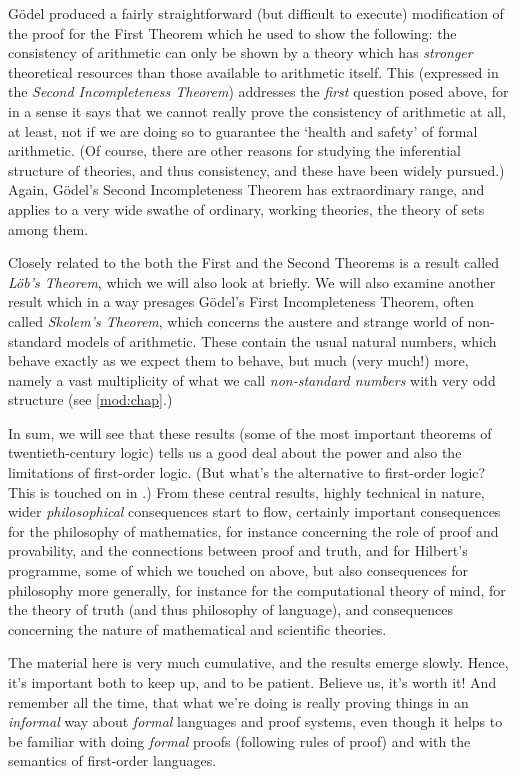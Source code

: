 G\"odel  produced a fairly straightforward (but difficult to execute)
modification of the proof  for the First Theorem which he used to show
the following: the consistency of arithmetic can only be shown by a
theory which has \emph{stronger} theoretical resources than those
available to arithmetic itself. This (expressed in the \emph{Second
Incompleteness Theorem}) addresses the \emph{first} question posed
above, for in a sense it says that we cannot really prove the
consistency of arithmetic at all, at least, not  if we are doing so to
guarantee the `health and safety' of formal arithmetic.  (Of course,
there are other reasons for studying the inferential structure of
theories, and thus consistency, and these have been widely pursued.)
Again, G\"odel's Second Incompleteness Theorem   has extraordinary
range, and applies to a very wide swathe of ordinary, working
theories, the theory of sets among them. 

Closely related to the both the First and the Second Theorems is a
result called \emph{L\"ob's Theorem}, which we will also look at
briefly. We will also examine another result which in a way presages
G\"odel's First Incompleteness Theorem, often called \emph{Skolem's
Theorem}, which concerns the austere and strange world of non-standard
models of arithmetic. These contain the usual natural numbers, which
behave exactly as we expect them to behave, but much (very much!{})
more,  namely a vast multiplicity of what we call \emph{non-standard
numbers} with very odd structure (see \cref{mod:chap}.) 

In sum, we will see that these results (some of the most important theorems of  twentieth-century logic) tells us a good deal about the power and also the limitations of  
first-order logic. (But what's the alternative to first-order logic?
This is touched on in .) From  these central
results, highly technical in nature, wider \emph{philosophical}
consequences start to flow, certainly important consequences for the
philosophy of mathematics, for instance concerning  the role of proof
and provability, and the connections between proof and truth, and for
Hilbert's programme, some of which we touched on above, but also
consequences for philosophy more generally, for instance for the
computational theory of mind, for the theory of truth (and thus
philosophy of language), and consequences concerning the nature of
mathematical and scientific theories. 

\bigskip

\noindent The material here is very much cumulative, and the results
emerge slowly. Hence, it's important both to keep up, and to be
patient. Believe us, it's worth it!{} And remember all the time, that
what we're doing is really proving things in an \emph{informal} way
about \emph{formal} languages and proof systems, even though it helps
to be familiar with doing \emph{formal} proofs (following rules of
proof) and with the semantics of first-order languages. 

